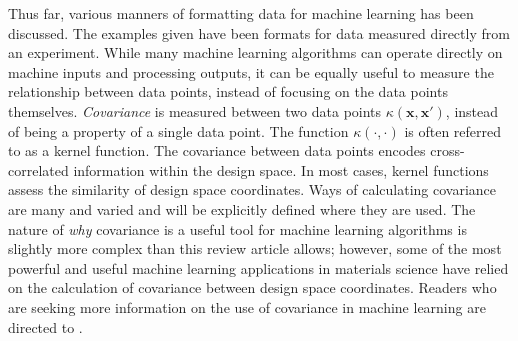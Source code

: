 Thus far, various manners of formatting data for machine learning has been discussed. The examples given have been formats for data measured directly from an experiment. While many machine learning algorithms can operate directly on machine inputs and processing outputs, it can be equally useful to measure the relationship between data points, instead of focusing on the data points themselves. \textit{Covariance} is measured between two data points $\kappa (\mathbf{x},\mathbf{x}')$, instead of being a property of a single data point. The function $\kappa(\cdot,\cdot)$ is often referred to as a kernel function. The covariance between data points encodes cross-correlated information within the design space. In most cases, kernel functions assess the similarity of design space coordinates. Ways of calculating covariance are many and varied and will be explicitly defined where they are used. The nature of \textit{why} covariance is a useful tool for machine learning algorithms is slightly more complex than this review article allows; however, some of the most powerful and useful machine learning applications in materials science have relied on the calculation of covariance between design space coordinates. Readers who are seeking more information on the use of covariance in machine learning are directed to \cite{KernelMethod}.
